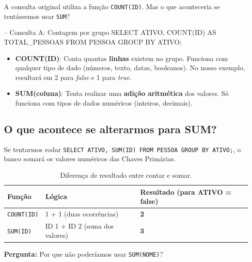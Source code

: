 A consulta original utiliza a função \texttt{COUNT(ID)}. Mas o que aconteceria se tentássemos usar \texttt{SUM}?



\begin{sqlcode}
-- Consulta A: Contagem por grupo
SELECT ATIVO, COUNT(ID) AS TOTAL_PESSOAS 
FROM PESSOA 
GROUP BY ATIVO;
\end{sqlcode}

\begin{tcolorbox}[colback=red!5,colframe=red!75!black,title=Conceito Fundamental]
\begin{itemize}
    \item \textbf{COUNT(ID)}: Conta quantas \textbf{linhas} existem no grupo. Funciona com qualquer tipo de dado (números, texto, datas, booleanos). No nosso exemplo, resultará em 2 para \textit{false} e 1 para \textit{true}.
    \item \textbf{SUM(coluna)}: Tenta realizar uma \textbf{adição aritmética} dos valores. Só funciona com tipos de dados numéricos (inteiros, decimais).
\end{itemize}
\end{tcolorbox}

\subsection{O que acontece se alterarmos para SUM?}

Se tentarmos rodar \texttt{SELECT ATIVO, SUM(ID) FROM PESSOA GROUP BY ATIVO;}, o banco somará os valores numéricos das Chaves Primárias.

\begin{table}[H]
    \centering
    \begin{tabular}{|l|l|l|}
    \hline
    \textbf{Função} & \textbf{Lógica} & \textbf{Resultado (para ATIVO = false)} \\ \hline
    \texttt{COUNT(ID)} & 1 + 1 (duas ocorrências) & \textbf{2} \\ \hline
    \texttt{SUM(ID)} & ID 1 + ID 2 (soma dos valores) & \textbf{3} \\ \hline
    \end{tabular}
    \caption{Diferença de resultado entre contar e somar.}
\end{table}



\begin{tcolorbox}[colback=orange!5,colframe=orange!70!black,title=Reflexão para o Aluno]
\textbf{Pergunta:} Por que não poderíamos usar \texttt{SUM(NOME)}?
\end{tcolorbox}

